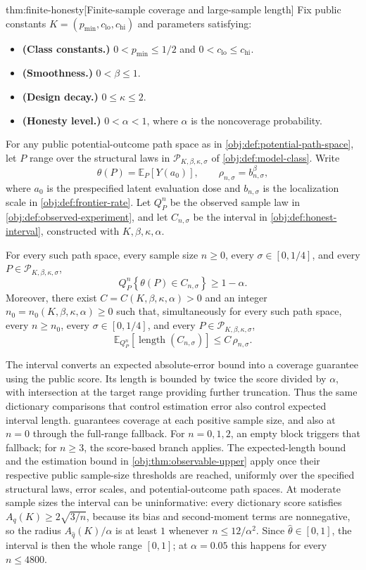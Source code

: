 \begin{theoremv}{thm:finite-honesty}[Finite-sample coverage and large-sample length]
Fix public constants \(K=(p_{\min},c_{\mathrm{lo}},c_{\mathrm{hi}})\) and parameters satisfying:
\begin{itemize}
\item \textbf{(Class constants.)} \(0<p_{\min}\le 1/2\) and \(0<c_{\mathrm{lo}}\le c_{\mathrm{hi}}\).
\item \textbf{(Smoothness.)} \(0<\beta\le 1\).
\item \textbf{(Design decay.)} \(0\le\kappa\le 2\).
\item \textbf{(Honesty level.)} \(0<\alpha<1\), where \(\alpha\) is the noncoverage probability.
\end{itemize}
For any public potential-outcome path space as in \cref{obj:def:potential-path-space}, let \(P\) range over the structural laws in \(\mathcal P_{K,\beta,\kappa,\sigma}\) of \cref{obj:def:model-class}. Write
\[
\theta(P)=\mathbb E_P[Y(a_0)],
\qquad
\rho_{n,\sigma}=b_{n,\sigma}^{\beta},
\]
where \(a_0\) is the prespecified latent evaluation dose and \(b_{n,\sigma}\) is the localization scale in \cref{obj:def:frontier-rate}. Let \(Q_P^n\) be the observed sample law in \cref{obj:def:observed-experiment}, and let \(C_{n,\sigma}\) be the interval in \cref{obj:def:honest-interval}, constructed with \(K,\beta,\kappa,\alpha\).

For every such path space, every sample size \(n\ge 0\), every \(\sigma\in[0,1/4]\), and every \(P\in\mathcal P_{K,\beta,\kappa,\sigma}\),
\[
Q_P^n\!\left\{\theta(P)\in C_{n,\sigma}\right\}\ge 1-\alpha.
\]
Moreover, there exist \(C=C(K,\beta,\kappa,\alpha)>0\) and an integer \(n_0=n_0(K,\beta,\kappa,\alpha)\ge 0\) such that, simultaneously for every such path space, every \(n\ge n_0\), every \(\sigma\in[0,1/4]\), and every \(P\in\mathcal P_{K,\beta,\kappa,\sigma}\),
\[
\mathbb E_{Q_P^n}\!\left[\operatorname{length}(C_{n,\sigma})\right]
\le C\,\rho_{n,\sigma}.
\]
\end{theoremv}

The interval converts an expected absolute-error bound into a coverage guarantee using the public score. Its length is bounded by twice the score divided by \(\alpha\), with intersection at the target range providing further truncation. Thus the same dictionary comparisons that control estimation error also control expected interval length.  guarantees coverage at each positive sample size, and also at \(n=0\) through the full-range fallback. For \(n=0,1,2\), an empty block triggers that fallback; for \(n\ge3\), the score-based branch applies. The expected-length bound and the estimation bound in \cref{obj:thm:observable-upper} apply once their respective public sample-size thresholds are reached, uniformly over the specified structural laws, error scales, and potential-outcome path spaces. At moderate sample sizes the interval can be uninformative: every dictionary score satisfies \(A_q(K)\ge2\sqrt{3/n}\), because its bias and second-moment terms are nonnegative, so the radius \(A_{\widehat q}(K)/\alpha\) is at least \(1\) whenever \(n\le12/\alpha^2\). Since \(\widehat\theta\in[0,1]\), the interval is then the whole range \([0,1]\); at \(\alpha=0.05\) this happens for every \(n\le4800\).
